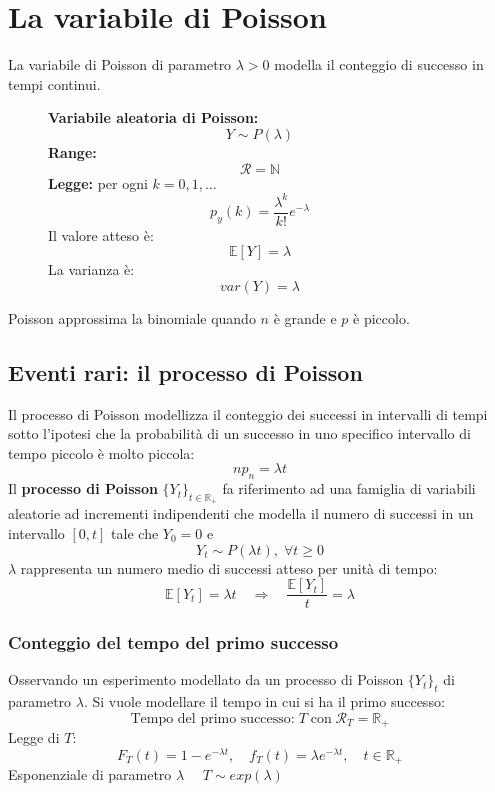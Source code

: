\documentclass[a4paper]{article}
\theoremstyle{break}
\theoremstyle{break}
\theoremstyle{break}
\theoremstyle{break}
\begin{document}
\section{La variabile di Poisson}
La variabile di Poisson di parametro \( \lambda > 0 \) modella il conteggio di successo
in tempi continui.
\begin{figure}[H]
  \begin{definition}
    \textbf{Variabile aleatoria di Poisson:}
    \[
    Y \sim P(\lambda)
    \] 
    \textbf{Range:}
    \[
      \mathcal{R} = \mathbb{N}
    \] 
    \textbf{Legge:} per ogni \( k = 0, 1, \ldots \) 
    \[
      p_y(k) = \frac{\lambda^k}{k!}e^{-\lambda}
    \] 
    Il valore atteso è:
    \[
      \mathbb{E}[Y] = \lambda
    \] 
    La varianza è:
    \[
    var(Y) = \lambda
    \] 
  \end{definition}
\end{figure}
Poisson approssima la binomiale quando \( n \) è grande e \( p \) è piccolo.

\subsection{Eventi rari: il processo di Poisson}
Il processo di Poisson modellizza il conteggio dei successi in intervalli di tempi
sotto l'ipotesi che la probabilità di un successo in uno specifico intervallo di tempo
piccolo è molto piccola:
\[
np_n = \lambda t
\] 
Il \textbf{processo di Poisson} \( \{Y_t\}_{t \in \mathbb{R}_+}  \) fa riferimento ad
una famiglia di variabili aleatorie ad incrementi indipendenti che modella il
numero di successi in un intervallo \( [0,t] \) tale che \( Y_0 = 0 \) e
\[
Y_t \sim P(\lambda t), \; \forall t \ge 0
\] 
\( \lambda \) rappresenta un numero medio di successi atteso per unità di tempo:
\[
  \mathbb{E}[Y_t] = \lambda t \quad \Rightarrow \quad \frac{\mathbb{E}[Y_t]}{t} = \lambda
\] 

\subsubsection{Conteggio del tempo del primo successo}
Osservando un esperimento modellato da un processo di Poisson \( \{Y_t\}_t  \) di 
parametro \( \lambda \). Si vuole modellare il tempo in cui si ha il primo successo:
\[
  \text{Tempo del primo successo:}\; T \;\text{con}\; \mathcal{R}_T = \mathbb{R}_+
\] 
Legge di \( T \):
\[
  F_T(t)= 1-e^{-\lambda t}, \quad f_T(t) = \lambda e^{-\lambda t}, \quad t \in \mathbb{R}_+
\] 
Esponenziale di parametro \( \lambda \quad \) \( T \sim exp(\lambda) \) 
\end{document}
